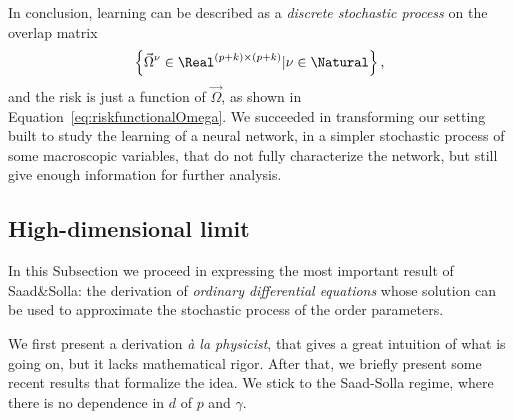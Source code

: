 In conclusion, learning can be described as a \emph{discrete stochastic process}
on the overlap matrix
\[\left\{\vec{\Omega}^\nu \in \Real^{(p+k)\times(p+k)}|\nu\in\Natural\right\},\]
and the risk is just a function of \(\vec{\Omega}\), as shown in Equation~\eqref{eq:riskfunctionalOmega}.
We succeeded in transforming our setting built to study the learning of a neural network,
in a simpler stochastic process of some macroscopic variables, that do not fully characterize
the network, but still give enough information for further analysis.





\subsection{High-dimensional limit}
In this Subsection we proceed in expressing the most important result of Saad\&Solla\cite{saad1995line}:
the derivation of \emph{ordinary differential equations} whose solution can be used
to approximate the stochastic process of the order parameters. 

We first present a derivation \emph{à la physicist}, that gives a great intuition of what is going on,
but it lacks mathematical rigor. After that, we briefly present some recent results that
formalize the idea.
We stick to the Saad-Solla regime, where there is no dependence in \(d\) of \(p\) and \(\gamma\).

